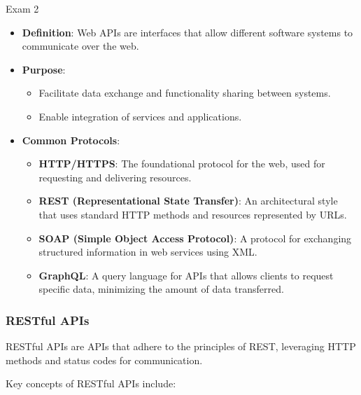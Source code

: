 \begin{examnotes}{Exam 2}
\begin{highlight}
        \begin{itemize}
            \item \textbf{Definition}: Web APIs are interfaces that allow different software systems to communicate over the web.
            \item \textbf{Purpose}:
                \begin{itemize}
                    \item Facilitate data exchange and functionality sharing between systems.
                    \item Enable integration of services and applications.
                \end{itemize}
            \item \textbf{Common Protocols}:
                \begin{itemize}
                    \item \textbf{HTTP/HTTPS}: The foundational protocol for the web, used for requesting and delivering resources.
                    \item \textbf{REST (Representational State Transfer)}: An architectural style that uses standard HTTP methods and resources represented by URLs.
                    \item \textbf{SOAP (Simple Object Access Protocol)}: A protocol for exchanging structured information in web services using XML.
                    \item \textbf{GraphQL}: A query language for APIs that allows clients to request specific data, minimizing the amount of data transferred.
                \end{itemize}
        \end{itemize}
    \end{highlight}
    
    \subsubsection*{RESTful APIs}
    
    RESTful APIs are APIs that adhere to the principles of REST, leveraging HTTP methods and status codes for communication.
    
    \begin{highlight}
        Key concepts of RESTful APIs include:
        

\end{highlight}
\end{examnotes}
